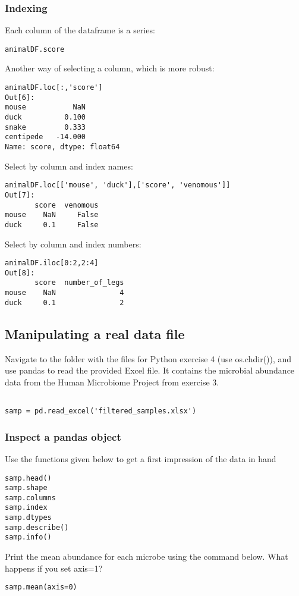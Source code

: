\documentclass[12pt]{article}
\begin{document}
\subsubsection{Indexing}
Each column of the dataframe is a series:
\begin{verbatim}
animalDF.score

\end{verbatim}
Another way of selecting a column, which is more robust:
\begin{verbatim}
animalDF.loc[:,'score']
Out[6]: 
mouse           NaN
duck          0.100
snake         0.333
centipede   -14.000
Name: score, dtype: float64

\end{verbatim}
Select by column and index names:
\begin{verbatim}
animalDF.loc[['mouse', 'duck'],['score', 'venomous']]
Out[7]: 
       score  venomous
mouse    NaN     False
duck     0.1     False

\end{verbatim}
Select by column and index numbers:
\begin{verbatim}
animalDF.iloc[0:2,2:4]
Out[8]: 
       score  number_of_legs
mouse    NaN               4
duck     0.1               2

\end{verbatim}
\subsection{Manipulating a real data file}
Navigate to the folder with the files for Python exercise 4 (use os.chdir()), and use pandas to read the provided Excel file. It contains the microbial abundance data from the Human Microbiome Project from exercise 3. 
\begin{verbatim}

samp = pd.read_excel('filtered_samples.xlsx')

\end{verbatim}
\subsubsection{Inspect a pandas object}
Use the functions given below to get a first impression of the data in hand
\begin{verbatim}
samp.head()
samp.shape
samp.columns
samp.index
samp.dtypes
samp.describe()
samp.info()

\end{verbatim}
Print the mean abundance for each microbe using the command below. What happens if you set axis=1?
\begin{verbatim}
samp.mean(axis=0)

\end{verbatim}
\end{document}
